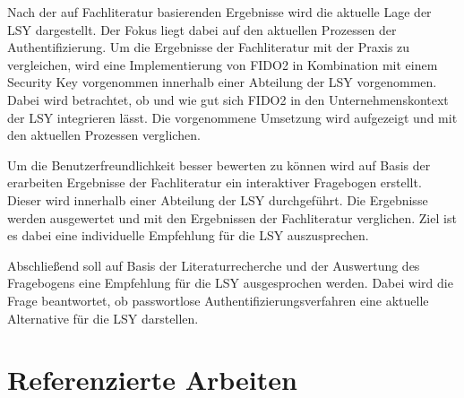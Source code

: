 Nach der auf Fachliteratur basierenden Ergebnisse wird die aktuelle Lage der \ac{LSY} dargestellt. Der Fokus liegt dabei auf den aktuellen Prozessen der Authentifizierung. Um die Ergebnisse der Fachliteratur mit der Praxis zu vergleichen, wird eine Implementierung von FIDO2 in Kombination mit einem Security Key vorgenommen innerhalb einer Abteilung der \ac{LSY} vorgenommen. Dabei wird betrachtet, ob und wie gut sich FIDO2 in den Unternehmenskontext der \ac{LSY} integrieren lässt. Die vorgenommene Umsetzung wird aufgezeigt und mit den aktuellen Prozessen verglichen.

Um die Benutzerfreundlichkeit besser bewerten zu können wird auf Basis der erarbeiten Ergebnisse der Fachliteratur ein interaktiver Fragebogen erstellt. Dieser wird innerhalb einer Abteilung der \ac{LSY} durchgeführt. Die Ergebnisse werden ausgewertet und mit den Ergebnissen der Fachliteratur verglichen. Ziel ist es dabei eine individuelle Empfehlung für die \ac{LSY} auszusprechen.

Abschließend soll auf Basis der Literaturrecherche und der Auswertung des Fragebogens eine Empfehlung für die \ac{LSY} ausgesprochen werden. Dabei wird die Frage beantwortet, ob passwortlose Authentifizierungsverfahren eine aktuelle Alternative für die \ac{LSY} darstellen.

\section{Referenzierte Arbeiten}